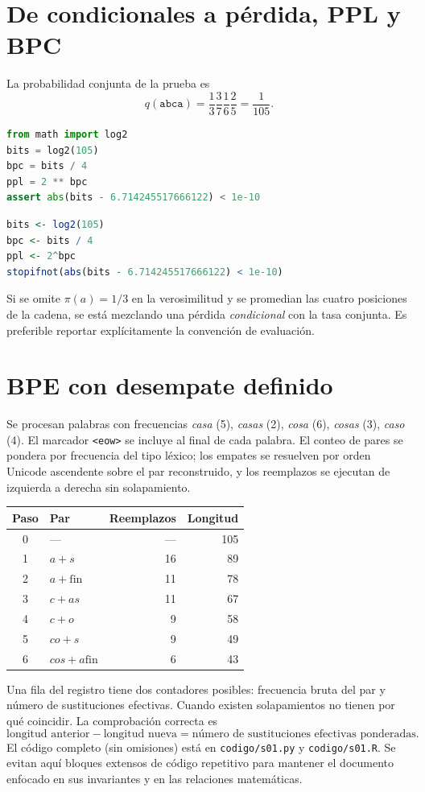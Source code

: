 \documentclass[11pt,a4paper]{report}
\begin{document}
\chapter{De condicionales a pérdida, PPL y BPC}
La probabilidad conjunta de la prueba es
\[
q(\texttt{abca})=\frac13\frac37\frac16\frac25=\frac1{105}.
\]
\begin{lstlisting}[language=Python]
from math import log2
bits = log2(105)
bpc = bits / 4
ppl = 2 ** bpc
assert abs(bits - 6.714245517666122) < 1e-10
\end{lstlisting}
\begin{lstlisting}[language=R]
bits <- log2(105)
bpc <- bits / 4
ppl <- 2^bpc
stopifnot(abs(bits - 6.714245517666122) < 1e-10)
\end{lstlisting}
Si se omite $\pi(a)=1/3$ en la verosimilitud y se promedian las
cuatro posiciones de la cadena, se está mezclando una pérdida
\emph{condicional} con la tasa conjunta. Es preferible reportar
explícitamente la convención de evaluación.
\chapter{BPE con desempate definido}
Se procesan palabras con frecuencias
\emph{casa} (5), \emph{casas} (2), \emph{cosa} (6),
\emph{cosas} (3), \emph{caso} (4).
El marcador \texttt{<eow>} se incluye al final de cada palabra.
El conteo de pares se pondera por frecuencia del tipo léxico;
los empates se resuelven por orden Unicode ascendente sobre el par
reconstruido, y los reemplazos se ejecutan de izquierda a derecha
sin solapamiento.
\begin{center}\small
\begin{tabular}{clrr}\toprule Paso & Par & Reemplazos & Longitud\\\midrule
0&---&---&105\\1&$a+s$&16&89\\2&$a+\mathrm{fin}$&11&78\\
3&$c+as$&11&67\\4&$c+o$&9&58\\5&$co+s$&9&49\\
6&$cos+a\mathrm{fin}$&6&43\\\bottomrule
\end{tabular}
\end{center}
Una fila del registro tiene dos contadores posibles: frecuencia bruta
del par y número de sustituciones efectivas. Cuando existen
solapamientos no tienen por qué coincidir. La comprobación correcta es
\[
\text{longitud anterior}-\text{longitud nueva}
=\text{número de sustituciones efectivas ponderadas}.
\]
El código completo (sin omisiones) está en
\texttt{codigo/s01.py} y \texttt{codigo/s01.R}. Se evitan aquí bloques
extensos de código repetitivo para mantener el documento enfocado en
sus invariantes y en las relaciones matemáticas.
\end{document}
